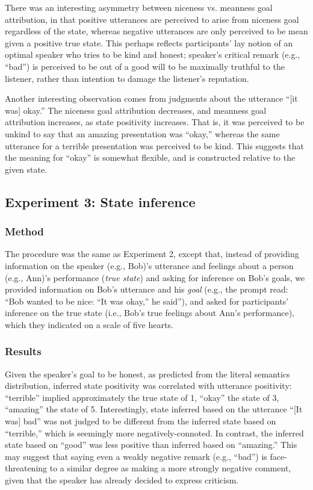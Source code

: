 \documentclass[10pt,letterpaper]{article}
\begin{document}
There was an interesting asymmetry between niceness vs. meanness goal attribution, in that positive utterances are perceived to arise from niceness goal regardless of the state, whereas negative utterances are only perceived to be mean given a positive true state. This perhaps reflects participants' lay notion of an optimal speaker who tries to be kind and honest; speaker's critical remark (e.g., ``bad'') is perceived to be out of a good will to be maximally truthful to the listener, rather than intention to damage the listener's reputation.

Another interesting observation comes from judgments about the utterance ``[it was] okay.'' The niceness goal attribution decreases, and meanness goal attribution increases, as state positivity increases. That is, it was perceived to be unkind to say that an amazing presentation was ``okay,'' whereas the same utterance for a terrible presentation was perceived to be kind. This suggests that the meaning for ``okay'' is somewhat flexible, and is constructed relative to the given state.

\subsection{Experiment 3: State inference}

\subsubsection{Method}

The procedure was the same as Experiment 2, except that, instead of providing information on the speaker (e.g., Bob)'s utterance and feelings about a person (e.g., Ann)'s performance (\emph{true state}) and asking for inference on Bob's goals, we provided information on Bob's utterance and his \emph{goal} (e.g., the prompt read: ``Bob wanted to be nice: ``It was okay,'' he said''), and asked for participants' inference on the true state (i.e., Bob's true feelings about Ann's performance), which they indicated on a scale of five hearts.

\subsubsection{Results}

Given the speaker's goal to be honest, as predicted from the literal semantics distribution, inferred state positivity was correlated with utterance positivity: ``terrible'' implied approximately the true state of 1, ``okay'' the state of 3, ``amazing'' the state of 5. Interestingly, state inferred based on the utterance ``[It was] bad'' was not judged to be different from the inferred state based on ``terrible,'' which is seemingly more negatively-connoted. In contrast, the inferred state based on ``good'' was less positive than inferred based on ``amazing.'' This may suggest that saying even a weakly negative remark (e.g., ``bad'') is face-threatening to a similar degree as making a more strongly negative comment, given that the speaker has already decided to express criticism.
\end{document}
